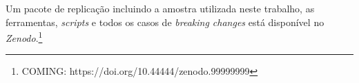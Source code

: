 

Um pacote de replicação incluindo a amostra utilizada neste trabalho, as ferramentas, \textit{scripts} e todos os casos de \textit{breaking changes} está disponível no \textit{Zenodo}.\footnote{COMING: https://doi.org/10.44444/zenodo.99999999}
